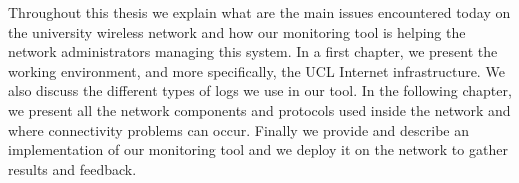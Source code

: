 Throughout this thesis we explain what are the main issues encountered today on the university wireless network and how our monitoring tool is helping the network administrators managing this system. In a first chapter, we present the working environment, and more specifically, the UCL Internet infrastructure. We also discuss the different types of logs we use in our tool. In the following chapter, we present all the network components and protocols used inside the network and where connectivity problems can occur. Finally we provide and describe an implementation of our monitoring tool and we deploy it on the network to gather results and feedback.
